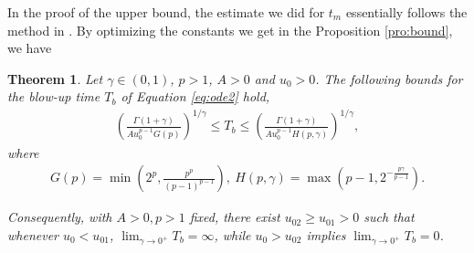 \documentclass[12pt]{amsart}%
\newtheorem{thm}{Theorem}[section]
\theoremstyle{definition}
\theoremstyle{remark}
\newtheorem{rmk}[thm]{Remark}
\renewcommand{\leq}{\leqslant}
\renewcommand{\geq}{\geqslant}
\renewcommand{\ge}{\geqslant}
\renewcommand{\le}{\leqslant}
\begin{document}

In the proof of the upper bound, the estimate we did for $t_m$ essentially follows the method in \cite{roberts1993volterra}.
By optimizing the constants we get in the Proposition \ref{pro:bound}, we have
\begin{thm}\label{buT}
Let $\gamma \in (0,1)$, $p>1$, $A>0$ and $u_0>0$. The following bounds for the blow-up time $T_b$ of Equation \eqref{eq:ode2} hold, 
\begin{gather}
\left(\frac{\Gamma(1+\gamma)}{Au_0^{p-1}G(p)}\right)^{1/\gamma}\le T_b \le 
\left(\frac{\Gamma(1+\gamma)}{Au_0^{p-1}H(p,\gamma)}\right)^{1/\gamma} ,
\end{gather}
where
\begin{gather}\label{eq:blowconst}
G(p)=\min\left(2^p, \frac{p^p}{(p-1)^{p-1}}\right), ~ H(p, \gamma)=\max\left(p-1, 2^{-\frac{p\gamma}{p-1}}\right).
\end{gather}

Consequently, with $A>0, p>1$ fixed, there exist $u_{02}\ge u_{01}>0$ such that whenever $u_0<u_{01}$, $\lim_{\gamma\to 0^+}T_b=\infty$, while $u_0>u_{02}$ implies $\lim_{\gamma\to 0^+}T_b=0$.
\end{thm}
\end{document}
